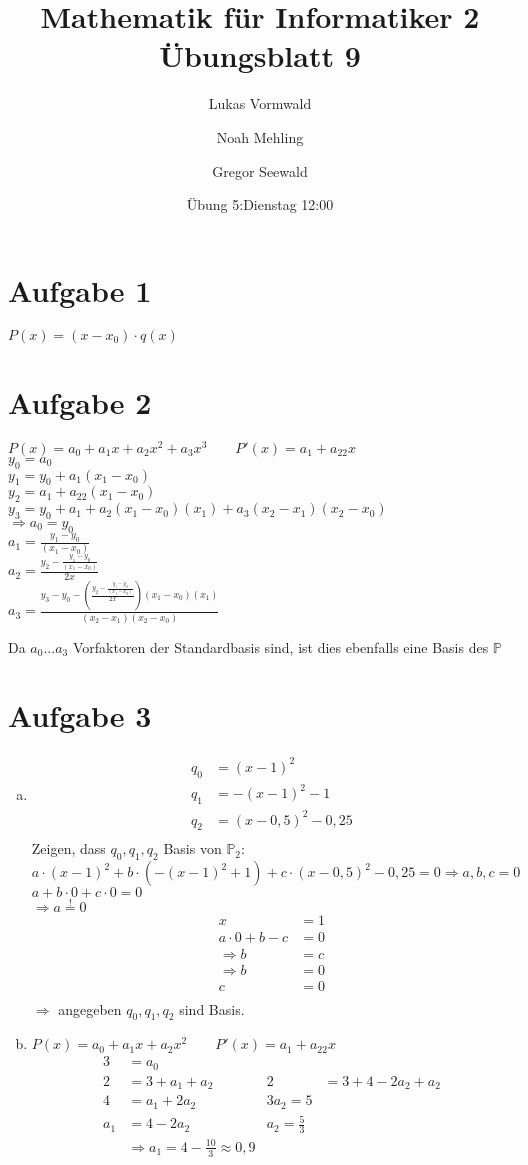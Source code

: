 \documentclass[11pt,a4paper]{article}
\title{Mathematik für Informatiker 2\\Übungsblatt 9}
\author{Lukas Vormwald \and Noah Mehling \and Gregor Seewald}
\date{Übung 5:Dienstag 12:00}
\newcommand{\Aufgabe}[1]{\section*{Aufgabe #1}}
\begin{document}
\maketitle

  \Aufgabe{1}
    $P(x)=(x-x_0)\cdot q(x)$

  \Aufgabe{2}
    $P(x)=a_0+a_1x+a_2x^2+a_3x^3\qquad P'(x)=a_1+a_22x$\\
    $y_0=a_0$\\
    $y_1=y_0+a_1(x_1-x_0)$\\
    $y_2=a_1+a_22(x_1-x_0)$\\
    $y_3=y_0+a_1+a_2(x_1-x_0)(x_1)+a_3(x_2-x_1)(x_2-x_0)$\\
    $\Rightarrow a_0=y_0$\\
    $a_1=\frac{y_1-y_0}{(x_1-x_0)}$\\
    $a_2=\frac{y_2-\frac{y_1-y_0}{(x_1-x_0)}}{2x}$\\
    $a_3=\frac{y_3-y_0-\left(\frac{y_2-\frac{y_1-y_0}{(x_1-x_0)}}{2x}\right)(x_1-x_0)(x_1)}{(x_2-x_1)(x_2-x_0)}$

    Da $a_0 ... a_3$ Vorfaktoren der Standardbasis sind, ist dies ebenfalls eine Basis des $\mathbb{P}$

    \Aufgabe{3}

      \begin{enumerate}[a)]
        \item
        \begin{align*}
            q_0&=(x-1)^2\\
            q_1&=-(x-1)^2-1\\
            q_2&=(x-0,5)^2-0,25\\
        \end{align*}
        Zeigen, dass $q_0,q_1,q_2$ Basis von $\mathbb{P}_2$:\\
        $a\cdot(x-1)^2+b\cdot\left(-(x-1)^2+1\right)+c\cdot(x-0,5)^2-0,25=0\Rightarrow a,b,c=0$\\
        $a+b\cdot 0+c\cdot 0=0$\\
        $\Rightarrow a\stackrel{!}{=}0$\\
        \begin{align*}
          x&=1\\
          a\cdot 0+b-c&=0\\
          \Rightarrow b&=c\\
          \Rightarrow b&=0\\
          c&=0\\
        \end{align*}
        $\Rightarrow$ angegeben $q_0,q_1,q_2$ sind Basis.
        \item
        $P(x)=a_0+a_1x+a_2x^2\qquad P'(x)=a_1+a_22x$\\
        \begin{align*}
          3&=a_0\\
          2&=3+a_1+a_2 & 2&=3+4-2a_2+a_2\\
          4&=a_1+2a_2 & 3a_2=5\\
          a_1&=4-2a_2 & a_2=\frac{5}{3}\\
          &\Rightarrow a_1=4-\frac{10}{3}\approx 0,9 
        \end{align*}
      \end{enumerate}
\end{document}

